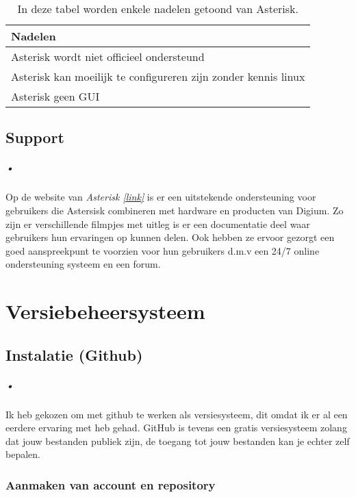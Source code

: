 \documentclass[12pt,a4paper]{report}
\begin{document}
\begin{table} [h]
\begin{tabular}{ | l | }
  \hline
  Nadelen\\
  \hline
  Asterisk wordt niet officieel ondersteund\\
  Asterisk kan moeilijk te configureren zijn zonder kennis linux\\
  Asterisk geen GUI\\
  \hline
\end{tabular}
\caption[Nadelen Asterisk]{In deze tabel worden enkele nadelen getoond van Asterisk.}
\end{table}

\newpage
\section{Support}
\paragraph{•}
Op de website van \emph{Asterisk \ref{link}} is er een uitstekende ondersteuning voor gebruikers die Astersisk combineren met hardware en producten van Digium. Zo zijn er verschillende filmpjes met uitleg is er een documentatie deel waar gebruikers hun ervaringen op kunnen delen. Ook hebben ze ervoor gezorgt een goed aanspreekpunt te voorzien voor hun gebruikers d.m.v een 24/7 online ondersteuning systeem en een forum.

\appendix
\chapter{Versiebeheersysteem}
\section{Instalatie (Github)}
\paragraph{•}
Ik heb gekozen om met github te werken als versiesysteem, dit omdat ik er al een eerdere ervaring met heb gehad. GitHub is tevens een gratis versiesysteem zolang dat jouw bestanden publiek zijn, de toegang tot jouw bestanden kan je echter zelf bepalen.

\subsection{Aanmaken van account en repository}
\end{document}
